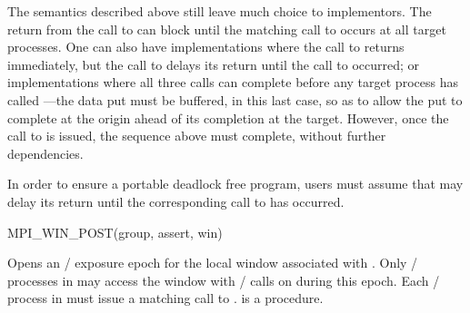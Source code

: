 \begin{implementors}
The semantics described above still leave
much choice to implementors. The return from the call to
 can block until the matching call to
 occurs at all target processes.  One can also
have implementations where the call to  returns immediately, but the
call to  delays its return until the call to
 occurred; or implementations where all
three calls can complete before any target process
has called 
---the
data put must be buffered, in this last case, so as to allow the
put to complete at the origin ahead of its completion at the 
target.
However, once the
call to  is issued, the sequence above
must complete, without further dependencies.
\end{implementors}

\begin{users}
In order to ensure a portable deadlock free program, users must assume that
 may delay its return until the corresponding call
to  has occurred.
\end{users}

%
%
\begin{funcdef}{MPI\_WIN\_POST}{(\mbox{group}, \mbox{assert}, \mbox{win})}
\end{funcdef}

Opens an \RMA/ exposure epoch for the
local window associated with .  Only \mpi/ processes in
 may access the window with \RMA/ calls on
 during  this 
epoch.
Each \mpi/ process in  must issue a matching call to 
.
 is a  procedure.

